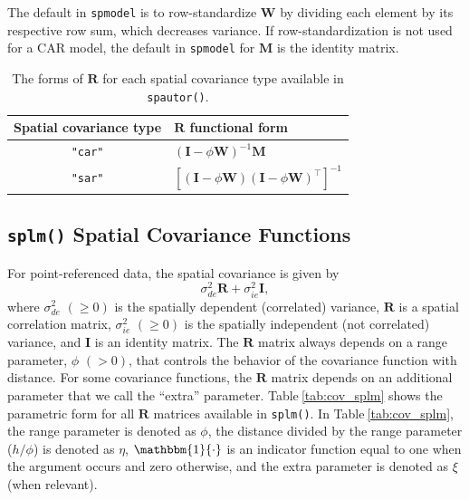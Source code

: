 \documentclass{article}
\begin{document}
The default in \texttt{spmodel} is to row-standardize \(\mathbf{W}\) by
dividing each element by its respective row sum, which decreases
variance. If row-standardization is not used for a CAR model, the
default in \texttt{spmodel} for \(\mathbf{M}\) is the identity matrix.

\begin{table}
  \centering
  \begin{tabular}{c|l}
  \hline
  Spatial covariance type & $\mathbf{R}$ functional form \\
  \hline
  \texttt{"car"} & $(\mathbf{I} - \phi\mathbf{W})^{-1}\mathbf{M}$ \\
  \texttt{"sar"} & $[(\mathbf{I} - \phi\mathbf{W})(\mathbf{I} - \phi\mathbf{W})^\top]^{-1}$ \\
  \hline
  \end{tabular}
  \caption{The forms of $\mathbf{R}$ for each spatial covariance type available in \texttt{spautor()}.}
  \label{tab:cov_spautor}
\end{table}

\hypertarget{splm-spatial-covariance-functions}{%
\subsection{\texorpdfstring{\texttt{splm()} Spatial Covariance
Functions}{splm() Spatial Covariance Functions}}\label{splm-spatial-covariance-functions}}

For point-referenced data, the spatial covariance is given by
\begin{equation*}
\sigma^2_{de}\mathbf{R} + \sigma^2_{ie} \mathbf{I},
\end{equation*} where \(\sigma^2_{de}\) \((\geq 0)\) is the spatially
dependent (correlated) variance, \(\mathbf{R}\) is a spatial correlation
matrix, \(\sigma^2_{ie}\) \((\geq 0)\) is the spatially independent (not
correlated) variance, and \(\mathbf{I}\) is an identity matrix. The
\(\mathbf{R}\) matrix always depends on a range parameter, \(\phi\)
\((> 0)\), that controls the behavior of the covariance function with
distance. For some covariance functions, the \(\mathbf{R}\) matrix
depends on an additional parameter that we call the ``extra'' parameter.
Table\(~\)\ref{tab:cov_splm} shows the parametric form for all
\(\mathbf{R}\) matrices available in \texttt{splm()}. In
Table\(~\)\ref{tab:cov_splm}, the range parameter is denoted as
\(\phi\), the distance divided by the range parameter (\(h / \phi\)) is
denoted as \(\eta\), \(\mathbbm{1}\{\cdot\}\) is an indicator function
equal to one when the argument occurs and zero otherwise, and the extra
parameter is denoted as \(\xi\) (when relevant).
\end{document}
